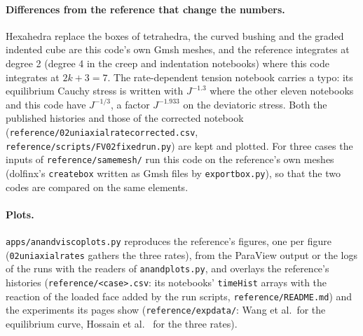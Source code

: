 \documentclass[11pt]{article}
\DeclareRobustCommand{\code}[1]{{\def\_{\textunderscore\allowbreak}\texttt{#1}}}
\DeclareRobustCommand{\file}[1]{{\def\_{\textunderscore\allowbreak}\texttt{#1}}}
\begin{document}
\paragraph{Differences from the reference that change the numbers.}
Hexahedra replace the boxes of tetrahedra, the curved bushing and the
graded indented cube are this code's own Gmsh meshes, and the reference
integrates at degree 2 (degree 4 in the creep and indentation notebooks)
where this code integrates at $2k + 3 = 7$.  The rate-dependent tension
notebook carries a typo: its equilibrium Cauchy stress is written with
$J^{-1.3}$ where the other eleven notebooks and this code have $J^{-1/3}$,
a factor $J^{-1.933}$ on the deviatoric stress.  Both the published
histories and those of the corrected notebook
(\file{reference/02\_uniaxial\_rate\_*\_corrected.csv},
\file{reference/scripts/FV02\_fixed\_run.py}) are kept and plotted.  For
three cases the inputs of \file{reference/same\_mesh/} run this code on the
reference's own meshes (dolfinx's \code{create\_box} written as Gmsh files
by \file{export\_box.py}), so that the two codes are compared on the same
elements.

\paragraph{Plots.}
\file{apps/anand\_visco\_plots.py} reproduces the reference's figures, one
per figure (\file{02\_uniaxial\_rates} gathers the three rates), from the
ParaView output or the logs of the runs with the readers of
\file{anand\_plots.py}, and overlays the reference's histories
(\file{reference/<case>.csv}: its notebooks' \code{timeHist} arrays with
the reaction of the loaded face added by the run scripts,
\file{reference/README.md}) and the experiments its pages show
(\file{reference/exp\_data/}: Wang et al.\ for the equilibrium curve,
Hossain et al.\ \cite{hossain2012} for the three rates).
\end{document}
